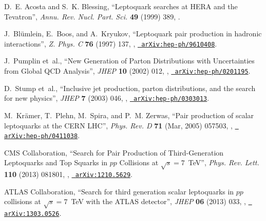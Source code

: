 \documentclass[12pt]{thesis}  %
\begin{document}
\begin{thebibliography}{100}
\hrefCMSnoop {} {D.~E. Acosta and S.~K. Blessing, ``Leptoquark searches at HERA
  and the Tevatron'',} \textit{ Annu. Rev. Nucl. Part. Sci.} \textbf{ 49}
  (1999) 389,
  \href{http://dx.doi.org/10.1146/annurev.nucl.49.1.389}{}.

\hrefCMSnoop {} {J.~Bl{\"u}mlein, E.~Boos, and A.~Kryukov, ``Leptoquark pair
  production in hadronic interactions'',} \textit{ Z. Phys. C} \textbf{ 76}
  (1997) 137,
  \href{http://dx.doi.org/10.1007/s002880050538}{},
  \href{http://www.arXiv.org/abs/hep-ph/9610408}{\texttt{
  arXiv:hep-ph/9610408}}.

J.~Pumplin\hrefCMSnoop {} { {et~al.}, ``New Generation of Parton Distributions
  with Uncertainties from Global QCD Analysis'',} \textit{ JHEP} \textbf{ 10}
  (2002) 012,
  \href{http://dx.doi.org/10.1088/1126-6708/2002/07/012}{},
  \href{http://www.arXiv.org/abs/hep-ph/0201195}{\texttt{
  arXiv:hep-ph/0201195}}.

D.~Stump\hrefCMSnoop {} { {et~al.}, ``Inclusive jet production, parton
  distributions, and the search for new physics'',} \textit{ JHEP} \textbf{ 7}
  (2003) 046,
  \href{http://dx.doi.org/10.1088/1126-6708/2003/10/046}{},
  \href{http://www.arXiv.org/abs/hep-ph/0303013}{\texttt{
  arXiv:hep-ph/0303013}}.

\hrefCMSnoop {} {M.~Kr{\"a}mer, T.~Plehn, M.~Spira, and P.~M. Zerwas, ``Pair
  production of scalar leptoquarks at the CERN LHC'',} \textit{ Phys. Rev. D}
  \textbf{ 71} (Mar, 2005) 057503,
  \href{http://dx.doi.org/10.1103/PhysRevD.71.057503}{},
  \href{http://www.arXiv.org/abs/hep-ph/0411038}{\texttt{
  arXiv:hep-ph/0411038}}.

\hrefCMSnoop {} {{CMS Collaboration}, ``Search for Pair Production of
  Third-Generation Leptoquarks and Top Squarks in $pp$ Collisions at
  $\sqrt{s}=7$~TeV'',} \textit{ Phys. Rev. Lett.} \textbf{ 110} (2013) 081801,
  \href{http://dx.doi.org/10.1103/PhysRevLett.110.081801}{},
  \href{http://www.arXiv.org/abs/1210.5629}{\texttt{ arXiv:1210.5629}}.

\hrefCMSnoop {} {{ATLAS Collaboration}, ``Search for third generation scalar
  leptoquarks in $pp$ collisions at $\sqrt{s}=7$~TeV with the ATLAS
  detector'',} \textit{ JHEP} \textbf{ 06} (2013) 033,
  \href{http://dx.doi.org/10.1007/JHEP06(2013)033}{},
  \href{http://www.arXiv.org/abs/1303.0526}{\texttt{ arXiv:1303.0526}}.


\end{thebibliography}
\end{document}
